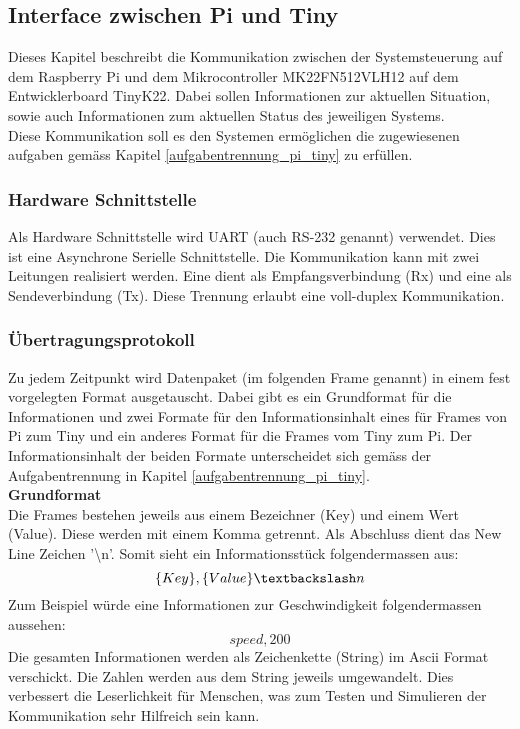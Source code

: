 \documentclass[../../main.tex]{subfiles}
\begin{document}
    \subsection{Interface zwischen Pi und Tiny} \label{interface_pi_tiny}
    Dieses Kapitel beschreibt die Kommunikation zwischen der Systemsteuerung auf dem Raspberry Pi und dem Mikrocontroller MK22FN512VLH12 auf dem Entwicklerboard TinyK22. Dabei sollen Informationen zur aktuellen Situation, sowie auch Informationen zum aktuellen Status des jeweiligen Systems.\\
    Diese Kommunikation soll es den Systemen ermöglichen die zugewiesenen aufgaben gemäss Kapitel \ref{aufgabentrennung_pi_tiny} zu erfüllen.

    \subsubsection{Hardware Schnittstelle}
    Als Hardware Schnittstelle wird UART (auch RS-232 genannt) verwendet. Dies ist eine Asynchrone Serielle Schnittstelle. Die Kommunikation kann mit zwei Leitungen realisiert werden. Eine dient als Empfangsverbindung (Rx) und eine als Sendeverbindung (Tx). Diese Trennung erlaubt eine voll-duplex Kommunikation. 

    \subsubsection{Übertragungsprotokoll}
    Zu jedem Zeitpunkt wird Datenpaket (im folgenden Frame genannt) in einem fest vorgelegten Format ausgetauscht. Dabei gibt es ein Grundformat für die Informationen und zwei Formate für den Informationsinhalt eines für Frames von Pi zum Tiny und ein anderes Format für die Frames vom Tiny zum Pi. Der Informationsinhalt der beiden Formate unterscheidet sich gemäss der Aufgabentrennung in Kapitel \ref{aufgabentrennung_pi_tiny}.\\
    
    \textbf{Grundformat}\\
    Die Frames bestehen jeweils aus einem Bezeichner (Key) und einem Wert (Value). Diese werden mit einem Komma getrennt. Als Abschluss dient das New Line Zeichen '\textbackslash n'. Somit sieht ein Informationsstück folgendermassen aus: $$\{Key\},\{Value\}\textbackslash n$$
    Zum Beispiel würde eine Informationen zur Geschwindigkeit folgendermassen aussehen: $$speed,200$$
    Die gesamten Informationen werden als Zeichenkette (String) im Ascii Format verschickt. Die Zahlen werden aus dem String jeweils umgewandelt. Dies verbessert die Leserlichkeit für Menschen, was zum Testen und Simulieren der Kommunikation sehr Hilfreich sein kann.
    
\end{document}
